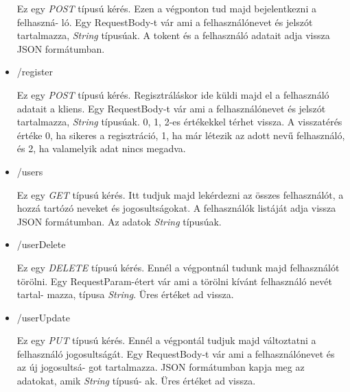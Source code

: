 \begin{itemize}
Ez egy \textit{POST} típusú kérés. Ezen a végponton tud majd bejelentkezni a felhaszná-
ló.
Egy RequestBody-t vár ami a felhasználónevet és jelszót tartalmazza, \textit{String} típusúak. A tokent és a felhasználó adatait adja vissza JSON formátumban.
\item /register

Ez egy \textit{POST} típusú kérés. Regisztráláskor ide küldi majd el a felhasználó adatait a kliens.
Egy RequestBody-t vár ami a felhasználónevet és jelszót tartalmazza, \textit{String} típusúak. 0, 1, 2-es értékekkel térhet vissza. A visszatérés értéke 0, ha sikeres a regisztráció, 1, ha már létezik az adott nevű felhasználó, és 2, ha valamelyik adat nincs megadva.  
\item /users

Ez egy \textit{GET} típusú kérés. Itt tudjuk majd lekérdezni az összes felhasználót, a hozzá tartózó neveket és jogosultságokat.
A felhasználók listáját adja vissza JSON formátumban. Az adatok \textit{String} típusúak.
\item /userDelete

Ez egy \textit{DELETE} típusú kérés. Ennél a végpontnál tudunk majd felhasználót törölni.
Egy RequestParam-étert vár ami a törölni kívánt felhasználó nevét tartal-
mazza, típusa \textit{String}. Üres értéket ad vissza.
\item /userUpdate

Ez egy \textit{PUT} típusú kérés. Ennél  a végpontál tudjuk majd változtatni a felhasználó jogosultságát.
Egy RequestBody-t vár ami a felhasználónevet és az új jogosultsá-
got tartalmazza. JSON formátumban kapja meg az adatokat, amik \textit{String} típusú-
ak. Üres értéket ad vissza.

\end{itemize}









